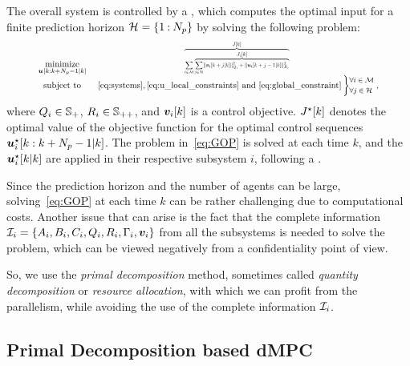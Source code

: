 \documentclass{ifacconf}  %
\begin{document}
The overall system is controlled by a \mpc{}, which
computes the optimal input for a finite prediction horizon ${\mathcal{H}=\{1\mathbin{:} N_{p}\}}$ by solving the following problem:
\begin{equation}\label{eq:GOP}
\resizebox{.88\columnwidth}{!}{$
\begin{matrix}
\underset{\useq}{\mathrm{minimize}}&\resizebox{0.35\textwidth}{!}{$\overbrace{\sum\limits_{i\in\set{M}} \overbrace{\sum_{j\in\set{H}}\norm{\mpcvec{v}[i][k+j][k]}^{2}_{Q_i}+\norm{\mpcvec{u}[i][k+j-1][k]}^{2}_{R_i}}^{\textstyle{} \obji}}^{\textstyle{} \globobj}$}\\
\mathrm{subject~ to}&~\eqref{eq:systems},\eqref{eq:u_local_constraints}\ \mathrm{and}\ \eqref{eq:global_constraint}
\left\}\small
\begin{aligned}
  &\forall i\in\set{M}\\
  &\forall j\in\set{H}
\end{aligned}\right.,

\end{matrix}
  $}
\end{equation}
where ${Q_{i}\in\mathbb{S}_{+}}$, ${R_{i}\in\mathbb{S}_{++}}$, and $\vik$ is a control objective.
$\optglobobj$ denotes the optimal value of the objective function for the optimal control sequences ${\optuiseq}$.
The problem in~\eqref{eq:GOP} is solved at each time $k$, and the ${\optuikk}$ are applied in their respective subsystem $i$, following a \rhs{}.

Since the prediction horizon and the number of agents can be large, solving~\eqref{eq:GOP} at each time $k$ can be rather challenging due to computational costs.
Another issue that can arise is the fact that the complete information ${\mathcal{I}_i=\{A_i,B_i,C_i,Q_i,R_i,\Gamma_i,\boldsymbol{v}_i\}}$ from all the subsystems is needed to solve the problem,
which can be viewed negatively from a confidentiality point of view.

So, we use the \emph{primal decomposition} method, sometimes called \emph{quantity decomposition} or \emph{resource allocation}, with which we can profit from the parallelism, while avoiding the use of the complete information $\mathcal{I}_{i}$.

\subsection{Primal Decomposition based dMPC}\label{ssec:dMPC}
\end{document}
